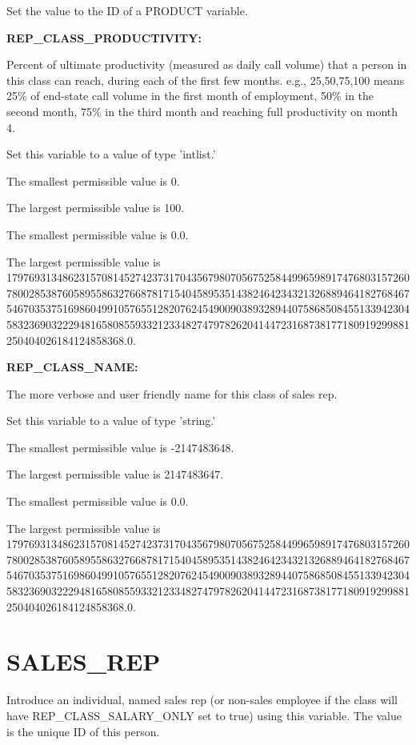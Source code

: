 Set the value to the ID of a PRODUCT variable.


\textbf{REP\_CLASS\_PRODUCTIVITY:}


Percent of ultimate productivity (measured as daily call volume) that a person in this class can reach, during each of the first few months.  e.g., 25,50,75,100 means 25\% of end-state call volume in the first month of employment, 50\% in the second month, 75\% in the third month and reaching full productivity on month 4.

Set this variable to a value of type 'intlist.'

The smallest permissible value is 0.

The largest permissible value is 100.

The smallest permissible value is 0.0.

The largest permissible value is 179769313486231570814527423731704356798070567525844996598917476803157260780028538760589558632766878171540458953514382464234321326889464182768467546703537516986049910576551282076245490090389328944075868508455133942304583236903222948165808559332123348274797826204144723168738177180919299881250404026184124858368.0.


\textbf{REP\_CLASS\_NAME:}


The more verbose and user friendly name for this class of sales rep.

Set this variable to a value of type 'string.'

The smallest permissible value is -2147483648.

The largest permissible value is 2147483647.

The smallest permissible value is 0.0.

The largest permissible value is 179769313486231570814527423731704356798070567525844996598917476803157260780028538760589558632766878171540458953514382464234321326889464182768467546703537516986049910576551282076245490090389328944075868508455133942304583236903222948165808559332123348274797826204144723168738177180919299881250404026184124858368.0.


\section{SALES\_REP}


Introduce an individual, named sales rep (or non-sales employee if the class will have REP\_CLASS\_SALARY\_ONLY set to true) using this variable.  The value is the unique ID of this person.

